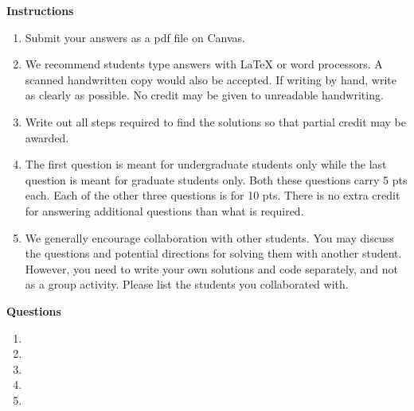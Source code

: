 



\textbf{Instructions}
\begin{enumerate}
    \item Submit your answers as a pdf file on Canvas. 
    \item We recommend students type answers with LaTeX or word processors. A scanned handwritten copy would also be accepted. If writing by hand, write as clearly as possible. No credit may be given to unreadable handwriting. 
    \item Write out all steps required to find the solutions so that partial credit may be awarded.
    \item The first question is meant for undergraduate students only while the last question is meant for graduate students only. Both these questions carry 5 pts each. Each of the other three questions is for 10 pts. There is no extra credit for answering additional questions than what is required.
    \item We generally encourage collaboration with other students. You may discuss the questions and potential directions for solving them with another student. However, you need to write your own solutions and code separately, and not as a group activity. Please list the students you collaborated with.
\end{enumerate}


\pagebreak
\textbf{Questions}

 \begin{enumerate}
   \item 
   \item 
   \item 
   \item 
   \item 
 \end{enumerate}



